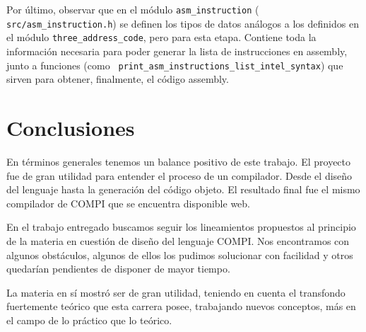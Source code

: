 \documentclass[12pt, a4paper, titlepage]{article}
\begin{document}
	Por último, observar que en el módulo {\tt asm\_instruction} ({\tt
	src/asm\_instruction.h}) se definen los tipos de datos análogos a los
	definidos en el módulo {\tt three\_address\_code}, pero para esta etapa.
	Contiene toda la información necesaria para poder generar la lista de
	instrucciones en assembly, junto a funciones (como {\tt
	print\_asm\_instructions\_list\_intel\_syntax}) que sirven para obtener,
	finalmente, el código assembly.

  \section{Conclusiones}\label{sec:conclusions}

  En términos generales tenemos un balance positivo de este trabajo. El proyecto
  fue de gran utilidad para entender el proceso de un compilador. Desde el
  diseño del lenguaje hasta la generación del código objeto. El resultado final
  fue el mismo compilador de COMPI que se encuentra disponible web.

  En el trabajo entregado buscamos seguir los lineamientos propuestos al
  principio de la materia en cuestión de diseño del lenguaje COMPI. Nos
  encontramos con algunos obstáculos, algunos de ellos los pudimos solucionar
  con facilidad y otros quedarían pendientes de disponer de mayor tiempo.

  La materia en sí mostró ser de gran utilidad, teniendo en cuenta el transfondo
  fuertemente teórico que esta carrera posee, trabajando nuevos conceptos, más
  en el campo de lo práctico que lo teórico.
\end{document}
